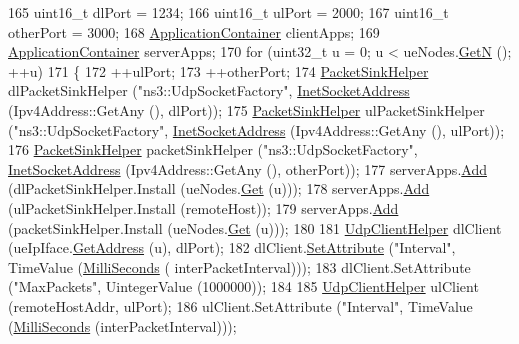 \begin{DoxyCode}
165   uint16\_t dlPort = 1234;
166   uint16\_t ulPort = 2000;
167   uint16\_t otherPort = 3000;
168   \hyperlink{classns3_1_1ApplicationContainer}{ApplicationContainer} clientApps;
169   \hyperlink{classns3_1_1ApplicationContainer}{ApplicationContainer} serverApps;
170   \textcolor{keywordflow}{for} (uint32\_t u = 0; u < ueNodes.\hyperlink{classns3_1_1NodeContainer_aed647ac56d0407a7706aba02eb44b951}{GetN} (); ++u)
171     \{
172       ++ulPort;
173       ++otherPort;
174       \hyperlink{classns3_1_1PacketSinkHelper}{PacketSinkHelper} dlPacketSinkHelper (\textcolor{stringliteral}{"ns3::UdpSocketFactory"}, 
      \hyperlink{classns3_1_1InetSocketAddress}{InetSocketAddress} (Ipv4Address::GetAny (), dlPort));
175       \hyperlink{classns3_1_1PacketSinkHelper}{PacketSinkHelper} ulPacketSinkHelper (\textcolor{stringliteral}{"ns3::UdpSocketFactory"}, 
      \hyperlink{classns3_1_1InetSocketAddress}{InetSocketAddress} (Ipv4Address::GetAny (), ulPort));
176       \hyperlink{classns3_1_1PacketSinkHelper}{PacketSinkHelper} packetSinkHelper (\textcolor{stringliteral}{"ns3::UdpSocketFactory"}, 
      \hyperlink{classns3_1_1InetSocketAddress}{InetSocketAddress} (Ipv4Address::GetAny (), otherPort));
177       serverApps.\hyperlink{classns3_1_1ApplicationContainer_ad09ab1a1ad5849d518d5f4c262e38152}{Add} (dlPacketSinkHelper.Install (ueNodes.\hyperlink{classns3_1_1NodeContainer_a9ed96e2ecc22e0f5a3d4842eb9bf90bf}{Get} (u)));
178       serverApps.\hyperlink{classns3_1_1ApplicationContainer_ad09ab1a1ad5849d518d5f4c262e38152}{Add} (ulPacketSinkHelper.Install (remoteHost));
179       serverApps.\hyperlink{classns3_1_1ApplicationContainer_ad09ab1a1ad5849d518d5f4c262e38152}{Add} (packetSinkHelper.Install (ueNodes.\hyperlink{classns3_1_1NodeContainer_a9ed96e2ecc22e0f5a3d4842eb9bf90bf}{Get} (u)));
180 
181       \hyperlink{classns3_1_1UdpClientHelper}{UdpClientHelper} dlClient (ueIpIface.\hyperlink{classns3_1_1Ipv4InterfaceContainer_ae63208dcd222be986822937ee4aa828c}{GetAddress} (u), dlPort);
182       dlClient.\hyperlink{classns3_1_1UdpClientHelper_a8bbae16a28f85ab3f3b5aa4642edfeae}{SetAttribute} (\textcolor{stringliteral}{"Interval"}, TimeValue (\hyperlink{group__timecivil_gaf26127cf4571146b83a92ee18679c7a9}{MilliSeconds} (
      interPacketInterval)));
183       dlClient.SetAttribute (\textcolor{stringliteral}{"MaxPackets"}, UintegerValue (1000000));
184 
185       \hyperlink{classns3_1_1UdpClientHelper}{UdpClientHelper} ulClient (remoteHostAddr, ulPort);
186       ulClient.SetAttribute (\textcolor{stringliteral}{"Interval"}, TimeValue (\hyperlink{group__timecivil_gaf26127cf4571146b83a92ee18679c7a9}{MilliSeconds} (interPacketInterval)));

\end{DoxyCode}
